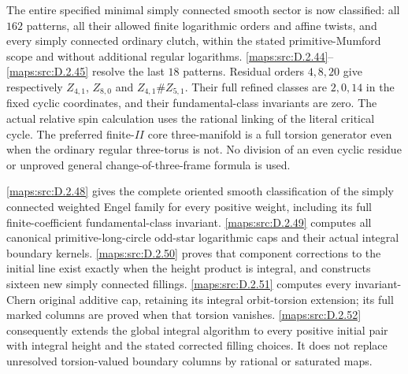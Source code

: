 \begin{problem}
The entire specified minimal simply connected smooth sector is now
classified: all $162$ patterns, all their allowed finite logarithmic
orders and affine twists, and every simply connected ordinary clutch,
within the stated primitive-Mumford scope and without additional
regular logarithms. \ref{maps:src:D.2.44}--\ref{maps:src:D.2.45} resolve the last $18$ patterns.
Residual orders $4,8,20$ give respectively
$Z_{4,1}$, $Z_{8,0}$ and $Z_{4,1}\#Z_{5,1}$.
Their full refined classes are $2,0,14$ in the fixed cyclic
coordinates, and their fundamental-class invariants are zero.
The actual relative spin calculation uses the rational linking of
the literal critical cycle. The preferred finite-$II$ core
three-manifold is a full torsion generator even when the ordinary
regular three-torus is not. No division of an even cyclic residue
or unproved general change-of-three-frame formula is used.

\ref{maps:src:D.2.48} gives the complete oriented smooth classification of the
simply connected weighted Engel family for every positive weight,
including its full finite-coefficient fundamental-class invariant.
\ref{maps:src:D.2.49} computes all canonical primitive-long-circle odd-star
logarithmic caps and their actual integral boundary kernels.
\ref{maps:src:D.2.50} proves that component corrections to the initial line exist
exactly when the height product is integral, and constructs sixteen
new simply connected fillings. \ref{maps:src:D.2.51} computes every invariant-Chern
original additive cap, retaining its integral orbit-torsion extension;
its full marked columns are proved when that torsion vanishes.
\ref{maps:src:D.2.52} consequently extends the global integral algorithm to every
positive initial pair with integral height and the stated corrected
filling choices. It does not replace unresolved torsion-valued
boundary columns by rational or saturated maps.


\end{problem}
